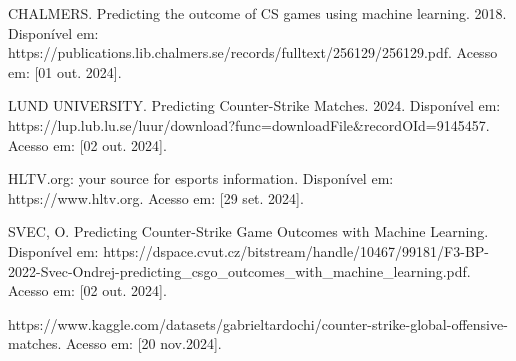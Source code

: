 \documentclass[a4paper,times,12pt]{article}
\begin{document}
\newpage
\begin{thebibliography}{00}

   CHALMERS. Predicting the outcome of CS games using machine learning. 2018. Disponível em: https://publications.lib.chalmers.se/records/fulltext/256129/256129.pdf. Acesso em: [01 out. 2024].

   LUND UNIVERSITY. Predicting Counter-Strike Matches. 2024. Disponível em: https://lup.lub.lu.se/luur/download?func=downloadFile\&recordOId=9145457. Acesso em: [02 out. 2024].

   HLTV.org: your source for esports information. Disponível em: https://www.hltv.org. Acesso em: [29 set. 2024].

   SVEC, O. Predicting Counter-Strike Game Outcomes with Machine Learning. Disponível em: https://dspace.cvut.cz/bitstream/handle/10467/99181/F3-BP-2022-Svec-Ondrej-predicting\_csgo\_outcomes\_with\_machine\_learning.pdf. Acesso em: [02 out. 2024].

   https://www.kaggle.com/datasets/gabrieltardochi/counter-strike-global-offensive-matches. Acesso em: [20 nov.2024].
\end{thebibliography}
\end{document}
